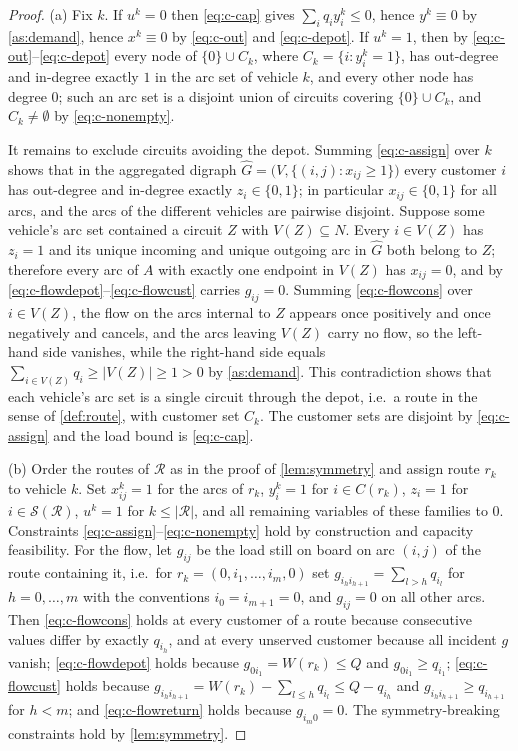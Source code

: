 \documentclass[11pt,a4paper]{article}
\theoremstyle{definition}
\theoremstyle{plain}
\newcommand{\Routes}{\mathcal{R}}
\newcommand{\Ground}{\mathcal{S}}
\newcommand{\Arcs}{A}
\newcommand{\Cust}{N}
\newcommand{\Nodes}{V}
\begin{document}
\begin{proof}
(a) Fix $k$.  If $u^k = 0$ then \eqref{eq:c-cap} gives
$\sum_i q_i y^k_i \le 0$, hence $y^k \equiv 0$ by \cref{as:demand}, hence
$x^k \equiv 0$ by \eqref{eq:c-out} and \eqref{eq:c-depot}.  If $u^k = 1$, then
by \eqref{eq:c-out}--\eqref{eq:c-depot} every node of
$\{0\} \cup C_k$, where $C_k = \{i : y^k_i = 1\}$, has out-degree and in-degree
exactly $1$ in the arc set of vehicle $k$, and every other node has degree $0$;
such an arc set is a disjoint union of circuits covering $\{0\} \cup C_k$, and
$C_k \ne \emptyset$ by \eqref{eq:c-nonempty}.

It remains to exclude circuits avoiding the depot.  Summing \eqref{eq:c-assign}
over $k$ shows that in the aggregated digraph
$\widehat{G} = \bigl(\Nodes, \{(i,j) : x_{ij} \ge 1\}\bigr)$ every customer $i$ has out-degree and
in-degree exactly $z_i \in \{0,1\}$; in particular $x_{ij} \in \{0,1\}$ for all
arcs, and the arcs of the different vehicles are pairwise disjoint.  Suppose
some vehicle's arc set contained a circuit $Z$ with $V(Z) \subseteq \Cust$.
Every $i \in V(Z)$ has $z_i = 1$ and its unique incoming and unique outgoing
arc in $\widehat{G}$ both belong to $Z$; therefore every arc of
$\Arcs$ with exactly one endpoint in $V(Z)$ has $x_{ij} = 0$, and by
\eqref{eq:c-flowdepot}--\eqref{eq:c-flowcust} carries $g_{ij} = 0$.  Summing
\eqref{eq:c-flowcons} over $i \in V(Z)$, the flow on the arcs internal to $Z$
appears once positively and once negatively and cancels, and the arcs leaving
$V(Z)$ carry no flow, so the left-hand side vanishes, while the right-hand side
equals $\sum_{i \in V(Z)} q_i \ge |V(Z)| \ge 1 > 0$ by \cref{as:demand}.  This
contradiction shows that each vehicle's arc set is a single circuit through the
depot, i.e.\ a route in the sense of \cref{def:route}, with customer set $C_k$.
The customer sets are disjoint by \eqref{eq:c-assign} and the load bound is
\eqref{eq:c-cap}.

(b) Order the routes of $\Routes$ as in the proof of \cref{lem:symmetry} and
assign route $r_k$ to vehicle $k$.  Set $x^k_{ij} = 1$ for the arcs of $r_k$,
$y^k_i = 1$ for $i \in C(r_k)$, $z_i = 1$ for $i \in \Ground(\Routes)$,
$u^k = 1$ for $k \le |\Routes|$, and all remaining variables of these families
to $0$.  Constraints
\eqref{eq:c-assign}--\eqref{eq:c-nonempty} hold by construction and capacity
feasibility.  For the flow, let $g_{ij}$ be the load still on board on arc
$(i,j)$ of the route containing it, i.e.\ for
$r_k = (0,i_1,\dots,i_m,0)$ set
$g_{i_h i_{h+1}} = \sum_{l > h} q_{i_l}$ for $h = 0,\dots,m$ with the
conventions $i_0 = i_{m+1} = 0$, and $g_{ij} = 0$ on all other arcs.  Then
\eqref{eq:c-flowcons} holds at every customer of a route because consecutive
values differ by exactly $q_{i_h}$, and at every unserved customer because all
incident $g$ vanish; \eqref{eq:c-flowdepot} holds because
$g_{0 i_1} = W(r_k) \le Q$ and $g_{0i_1} \ge q_{i_1}$;
\eqref{eq:c-flowcust} holds because
$g_{i_h i_{h+1}} = W(r_k) - \sum_{l \le h} q_{i_l} \le Q - q_{i_h}$ and
$g_{i_h i_{h+1}} \ge q_{i_{h+1}}$ for $h < m$; and \eqref{eq:c-flowreturn}
holds because $g_{i_m 0} = 0$.  The symmetry-breaking constraints hold by
\cref{lem:symmetry}.
\end{proof}
\end{document}
